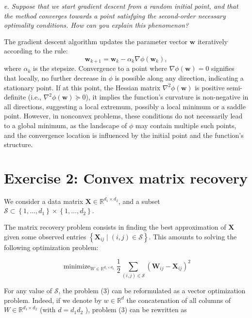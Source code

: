 \documentclass[12pt]{article}
\begin{document}
    \textit{e. Suppose that we start gradient descent from a random initial point, and that the method converges towards a point satisfying the second-order necessary optimality conditions. How can you explain this phenomenon?}

    The gradient descent algorithm updates the parameter vector \(\boldsymbol{w}\) iteratively according to the rule:
    \[
        \boldsymbol{w}_{k+1} = \boldsymbol{w}_k - \alpha_k \nabla \phi(\boldsymbol{w}_k),
    \]
    where \(\alpha_k\) is the stepsize. Convergence to a point where \(\nabla \phi(\boldsymbol{w}) = 0\) signifies that locally, no further decrease in \(\phi\) is possible along any direction, indicating a stationary point. If at this point, the Hessian matrix \(\nabla^2 \phi(\boldsymbol{w})\) is positive semi-definite (i.e., \(\nabla^2 \phi(\boldsymbol{w}) \succeq 0\)), it implies the function's curvature is non-negative in all directions, suggesting a local extremum, possibly a local minimum or a saddle point. However, in nonconvex problems, these conditions do not necessarily lead to a global minimum, as the landscape of \(\phi\) may contain multiple such points, and the convergence location is influenced by the initial point and the function's structure.

    \section*{Exercise 2: Convex matrix recovery}
    We consider a data matrix $\boldsymbol{X} \in \mathbb{R}^{d_{1} \times d_{2}}$, and a subset $\mathcal{S} \subset\left\{1, \ldots, d_{1}\right\} \times\left\{1, \ldots, d_{2}\right\}$.

    The matrix recovery problem consists in finding the best approximation of $\boldsymbol{X}$ given some observed entries $\left\{\boldsymbol{X}_{i j} \mid(i, j) \in \mathcal{S}\right\}$. This amounts to solving the following optimization
    problem:

    \begin{equation}
        \operatorname{minimize}_{W \in \mathbb{R}^{d_{1} \times d_{2}}} \frac{1}{2} \sum_{(i, j) \in \mathcal{S}}\left(\boldsymbol{W}_{i j}-\boldsymbol{X}_{i j}\right)^{2}
    \end{equation}


    For any value of $\mathcal{S}$, the problem (3) can be reformulated as a vector optimization problem. Indeed, if we denote by $w \in \mathbb{R}^{d}$ the concatenation of all columns of $W \in \mathbb{R}^{d_{1} \times d_{2}}$ (with
    $d=d_{1} d_{2}$ ), problem (3) can be rewritten as
\end{document}

